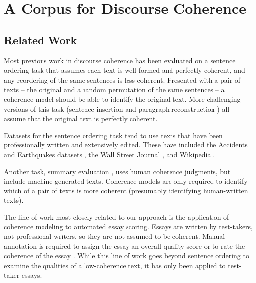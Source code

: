\documentclass[11pt,a4paper]{article}
\begin{document}
\section{A Corpus for Discourse Coherence}
\label{sec:data}

\subsection{Related Work}

Most previous work in discourse coherence has been evaluated on a sentence ordering task that assumes each text is well-formed and perfectly coherent, and any reordering of the same sentences is less coherent. Presented with a pair of texts -- the original and a random permutation of the same sentences -- a coherence model should be able to identify the original text. More challenging versions of this task (sentence insertion \cite{elsner-charniak:2011:ACL} and paragraph reconstruction \cite{lapata:2003:ACL,li-jurafsky:2017:EMNLP}) all assume that the original text is perfectly coherent.

Datasets for the sentence ordering task tend to use texts that have been professionally written and extensively edited. These have included the Accidents and Earthquakes datasets \cite{barzilay-lapata:2005:ACL}, the Wall Street Journal \cite{elsner-charniak:2008:ACLShort,elsner-charniak:2011:ACL,lin-ng-kan:2011:ACL-HLT2011,feng-lin-hirst:2014:Coling,nguyen-joty:2017:ACL}, and Wikipedia \cite{li-jurafsky:2017:EMNLP}. 






Another task, summary evaluation \cite{barzilay-lapata:2005:ACL}, uses human coherence judgments, but include machine-generated texts. Coherence models are only required to identify which of a pair of texts is more coherent (presumably identifying human-written texts). 


The line of work most closely related to our approach is the application of coherence modeling to automated essay scoring. Essays are written by test-takers, not professional writers, so they are not assumed to be coherent. Manual annotation is required to assign the essay an overall quality score \cite{feng-lin-hirst:2014:Coling} or to rate the coherence of the essay \cite{somasundaran-burstein-chodorow:2014:Coling,burstein:2010:naacl,BursteinTC13}.
While this line of work goes beyond sentence ordering to examine the qualities of a low-coherence text, it has only been applied to test-taker essays. 
\end{document}
